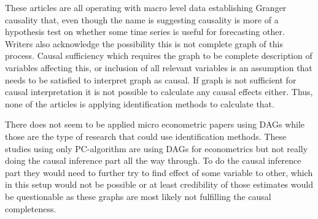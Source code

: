 \documentclass[main=english,12pt,a4paper,pdftex,econ,utf8]{aaltothesis}
\begin{document}
These articles are all operating with macro level data establishing Granger causality that, even though the name is suggesting causality is more of a hypothesis test on whether some time series is useful for forecasting other. Writers also acknowledge the possibility this is not complete graph of this process. Causal sufficiency which requires the graph to be complete description of variables affecting this, or inclusion of all relevant variables is an assumption that needs to be satisfied to interpret graph as causal. If graph is not sufficient for causal interpretation it is not possible to calculate any causal effects either. Thus, none of the articles is applying identification methods to calculate that. 

There does not seem to be applied micro econometric papers using DAGs while those are the type of research that could use identification methods. These studies using only PC-algorithm are using DAGs for econometrics but not really doing the causal inference part all the way through. To do the causal inference part they would need to further try to find effect of some variable to other, which in this setup would not be possible or at least credibility of those estimates would be questionable as these graphs are most likely not fulfilling the causal completeness.
\end{document}
